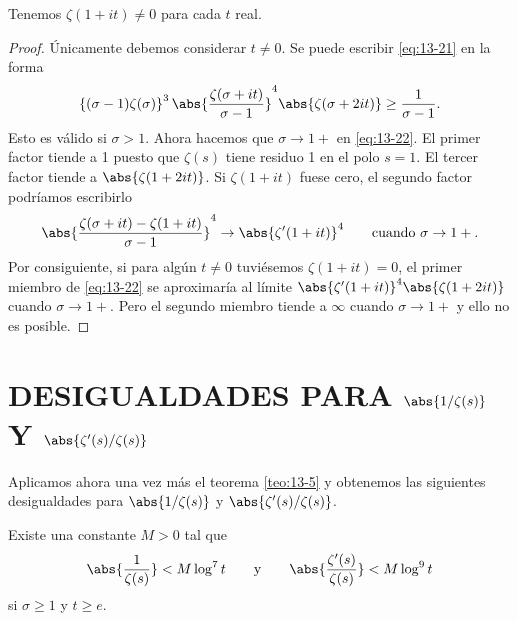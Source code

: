     \begin{teorema}\label{teo:13-6}
        Tenemos $\zeta(1+it)\neq0$ para cada $t$ real.
    \end{teorema}

    \begin{proof}
        Únicamente debemos considerar $t\neq0$. Se puede escribir \eqref{eq:13-21} en la forma
        \begin{equation}\label{eq:13-22}
            \left\{(\sigma-1)\zeta(\sigma)\right\}^3\abs{\frac{\zeta(\sigma+it)}{\sigma-1}}^4\abs{\zeta(\sigma+2it)}\geq\frac{1}{\sigma-1}.
        \end{equation}
        Esto es válido si $\sigma>1$. Ahora hacemos que $\sigma\to1+$ en \eqref{eq:13-22}. El
        primer factor tiende a 1 puesto que $\zeta(s)$ tiene residuo 1 en el polo $s=1$. El
        tercer factor tiende a $\abs{\zeta(1+2it)}$. Si $\zeta(1+it)$ fuese cero, el segundo
        factor podríamos escribirlo
        \begin{equation*}
            \abs{\frac{\zeta(\sigma+it)-\zeta(1+it)}{\sigma-1}}^4\to\abs{\zeta'(1+it)}^4\qquad\text{cuando }\sigma\to1+.
        \end{equation*}
        Por consiguiente, si para algún $t\neq0$ tuviésemos $\zeta(1+it)=0$, el primer miembro
        de \eqref{eq:13-22} se aproximaría al límite $\abs{\zeta'(1+it)}^4\abs{\zeta(1+2it)}$
        cuando $\sigma\to1+$. Pero el segundo miembro tiende a $\infty$ cuando $\sigma\to1+$ y
        ello no es posible.
    \end{proof}

    \section[DESIGUALDADES PARA $\abs{1/\zeta(s)}$ Y $\abs{\zeta'(s)/\zeta(s)}$]{DESIGUALDADES PARA \texorpdfstring{$\abs{1/\zeta(s)}$}{|1/ζ(s)|} Y \texorpdfstring{$\abs{\zeta'(s)/\zeta(s)}$}{|ζ'(s)/ζ(s)|}}

    Aplicamos ahora una vez más el teorema \ref{teo:13-5} y obtenemos las siguientes
    desigualdades para $\abs{1/\zeta(s)}$ y $\abs{\zeta'(s)/\zeta(s)}$.

    \begin{teorema}\label{teo:13-7}
        Existe una constante $M>0$ tal que
        \begin{equation*}
            \abs{\frac{1}{\zeta(s)}}<M\log^7t\qquad\text{y}\qquad\abs{\frac{\zeta'(s)}{\zeta(s)}}<M\log^9t
        \end{equation*}
        si $\sigma\geq1$ y $t\geq e$.
    \end{teorema}

